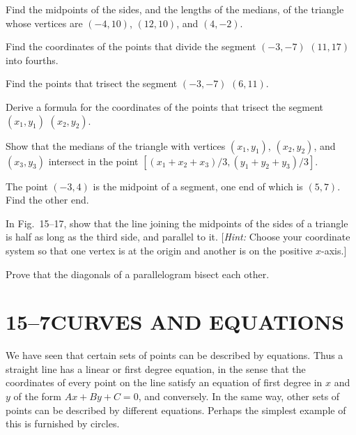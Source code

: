\documentclass[11pt]{book}
\theoremstyle{bkplain}
\theoremstyle{XIplainnote}
\theoremstyle{bkplain}
\theoremstyle{bkplain}
\begin{document}
\begin{exercisecols}
\begin{exlist}
\item Find the midpoints of the sides, and the lengths of the medians, of the
  triangle whose vertices are $(-4, 10)$, $(12, 10)$, and $(4, -2)$.
\item Find the coordinates of the points that divide the segment $(-3, -7)$
  $(11, 17)$ into fourths.
\item[\stex 3.] Find the points that trisect the segment $(-3, -7)$
  $(6, 11)$.
\item[\stex 4.] Derive a formula for the coordinates of the points that
  trisect the segment $(x_1, y_1)$ $(x_2, y_2)$.
\item[\stex 5.] Show that the medians of the triangle with vertices
  $(x_1, y_1)$, $(x_2, y_2)$, and $(x_3, y_3)$ intersect in the point
  $[(x_1 + x_2 + x_3)/3, (y_1 + y_2 + y_3)/3]$.
\item[6.] The point $(-3, 4)$ is the midpoint of a segment, one end of which
  is $(5, 7)$. Find the other end.
\item[\stex 7.] In Fig.~15--17, show that the line joining the midpoints of
  the sides of a triangle is half as long as the third side, and parallel to
  it. [\emph{Hint:} Choose your coordinate system so that one vertex is at the
  origin and another is on the positive $x$-axis.]
\exfig{\FIGXVSEVENTEEN}
\item[\stex 8.] Prove that the diagonals of a parallelogram bisect each
  other.
\end{exlist}
\end{exercisecols}

\section*{15--7\quad CURVES AND EQUATIONS}

We have seen that certain sets of points can be described by equations. Thus a
straight line has a linear or first degree equation, in the sense that the
coordinates of every point on the line satisfy an equation of first degree in
$x$ and $y$ of the form $Ax + By + C = 0$, and conversely. In the same way,
other sets of points can be described by different equations. Perhaps the
simplest example of this is furnished by circles.
\end{document}
